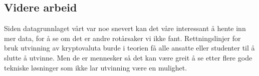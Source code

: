 \subsection{Videre arbeid}
Siden datagrunnlaget vårt var noe snevert kan det våre interessant å hente inn mer data, for å se om det er andre rotårsaker vi ikke fant. Rettningslinjer for bruk utvinning av kryptovaluta burde i teorien få alle ansatte eller studenter til å slutte å utvinne. Men de er mennesker så det kan være greit å se etter flere gode tekniske løsninger som ikke lar utvinning være en mulighet.






